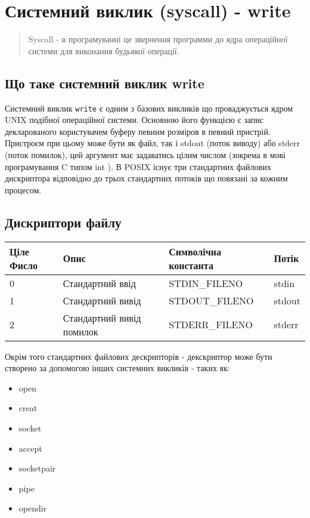\section{Системний виклик (syscall) - write}

  \begin{quote}
  Syscall - в програмуванні це звернення программи до ядра операційної системи для виконання будьякої операції.
  \end{quote}

  \subsection{Що таке системний виклик write}
  Системний виклик \texttt{write} є одним з базових викликів що проваджується ядром UNIX подібної операційної системи. Основною його функцією є запис декларованого користувачем буферу певним розміров в певний пристрій. Пристроєм при цьому може бути як файл, так і stdout (поток виводу) або stderr (поток помилок), цей аргумент має задаватись цілим числом (зокрема в мові програмування C типом int ). В POSIX існує три стандартних файлових дискриптора відповідно до трьох стандартних потоків що повязані за кожним процесом.

  \subsection{Дискриптори файлу}
  \begin{center}
    \begin{tabular}{ l | l | l | l }
      \textbf{Ціле Фисло} & Опис &  \textbf{Символічна константа} & Потік \\ \hline
      0 & Стандартний ввід & STDIN\_FILENO & stdin \\ \hline
      1 & Стандартний вивід  & STDOUT\_FILENO & stdout \\ \hline
      2 & Стандартний вивід помилок & STDERR\_FILENO & stderr \\ \hline
    \end{tabular}
  \end{center}

  Окрім того стандартних файлових дескрипторів - декскриптор може бути створено за допомогою інших системних викликів - таких як:
  \begin{itemize}
    \item open
    \item creat
    \item socket
    \item accept
    \item socketpair
    \item pipe
    \item opendir
    \end{itemize}

